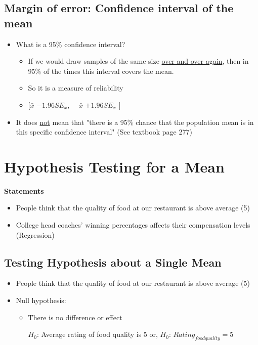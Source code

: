 \documentclass[10pt,article]{article}
\begin{document}
\subsection{Margin of error: Confidence interval of the mean}
\label{sec:org724a5c8}
\begin{itemize}
\item What is a 95\% confidence interval?
\begin{itemize}
\item If we would draw samples of the same size \uline{over and over again}, then in 95\%
of the times this interval covers the mean.
\item So it is a measure of reliability
\item \([ \bar{x}\)  \(- 1.96 SE_{\bar{x}} \), \(\quad \bar{x}\)
 \( + 1.96 SE_{\bar{x}} \) \(]\)
\end{itemize}

\item It does \uline{not} mean that "there is a 95\% chance that the population mean is
in this specific confidence interval" (See textbook page 277)
\end{itemize}
\section{Hypothesis Testing for a Mean}
\label{sec:orga21411d}
\textbf{Statements}

\begin{itemize}
\item People think that the quality of food at our restaurant is above average (5)

\item College head coaches' winning percentages affects their compensation levels
(Regression)
\end{itemize}
\subsection{Testing Hypothesis about a Single Mean}
\label{sec:orgee6fc1c}
\begin{itemize}
\item People think that the quality of food at our restaurant is above average (5)

\item Null hypothesis:
\begin{itemize}
\item There is no difference or effect 

\(H_0\): Average rating of food quality is 5 or, 
\(H_0\): \(Rating_{foodquality} = 5\)
\end{itemize}
\end{itemize}
\end{document}
